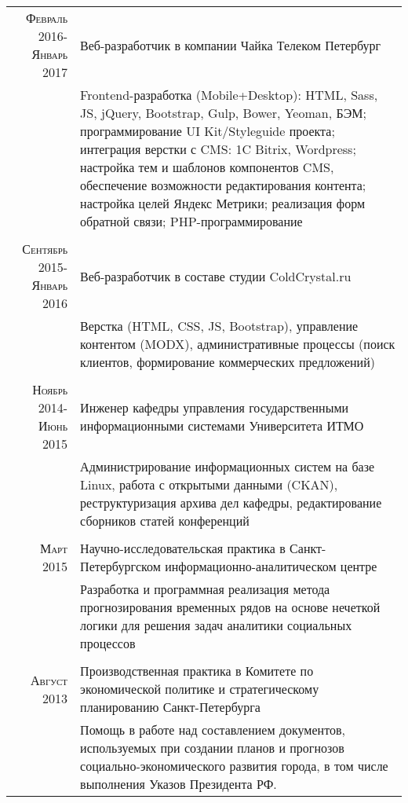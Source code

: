 \documentclass[a4paper,10pt]{article} %
\begin{document}
\begin{tabular}{r|p{11cm}}
    \textsc{Февраль 2016-Январь 2017} & Веб-разработчик в компании Чайка Телеком Петербург\\
    & \footnotesize{Frontend-разработка (Mobile+Desktop): HTML, Sass, JS, jQuery,
        Bootstrap, Gulp, Bower, Yeoman, БЭМ; программирование UI Kit/Styleguide
        проекта; интеграция верстки с CMS: 1C Bitrix, Wordpress; настройка тем и
        шаблонов компонентов CMS, обеспечение возможности редактирования
        контента; настройка целей Яндекс Метрики; реализация форм обратной
    связи; PHP-программирование}\\
\multicolumn{2}{c}{} \\
    \textsc{Сентябрь 2015-Январь 2016} & Веб-разработчик в составе студии
    ColdCrystal.ru\\
    & \footnotesize{Верстка (HTML, CSS, JS, Bootstrap), управление контентом
        (MODX), административные процессы (поиск клиентов, формирование
        коммерческих предложений)}\\
\multicolumn{2}{c}{} \\
    \textsc{Ноябрь 2014-Июнь 2015} & Инженер кафедры управления государственными
    информационными системами Университета ИТМО\\
    & \footnotesize{Администрирование информационных систем на базе Linux,
        работа с открытыми данными (CKAN), реструктуризация архива дел кафедры,
        редактирование сборников статей конференций}\\
\multicolumn{2}{c}{} \\
\textsc{Март 2015} & Научно-исследовательская практика в Санкт-Петербургском
информационно-аналитическом центре\\
& \footnotesize{Разработка и программная реализация метода прогнозирования временных рядов на основе нечеткой
    логики для решения задач аналитики социальных процессов}\\
\multicolumn{2}{c}{} \\


\textsc{Август 2013} & Производственная практика в Комитете по экономической политике и
стратегическому планированию Санкт-Петербурга \\
& \footnotesize{Помощь в работе над составлением документов, используемых при
    создании
    планов и прогнозов социально-экономического развития города, в том числе выполнения Указов Президента РФ.}
\end{tabular}
\end{document}
